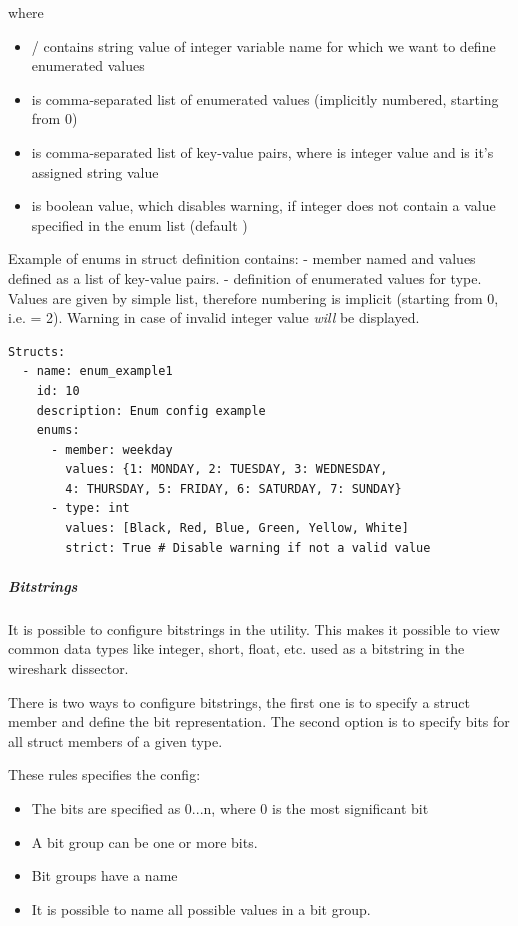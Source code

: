 \documentclass[A4paper,10pt,english]{sphinxmanual}
\begin{document}
where
\begin{itemize}
\item {} 
/ contains string value of integer variable name for which we want to define enumerated values

\item {} 
 is comma-separated list of enumerated values (implicitly numbered, starting from 0)

\item {} 
 is comma-separated list of key-value pairs, where  is integer value and  is it's assigned string value

\item {} 
 is boolean value, which disables warning, if integer does not contain a value specified in the enum list (default )

\end{itemize}

Example of enums in struct definition contains:
- member named  and values defined as a list of key-value pairs.
- definition of enumerated values for  type. Values are given by simple list, therefore numbering is implicit (starting from 0, i.e.  = 2). Warning in case of invalid integer value \emph{will} be displayed.

\begin{Verbatim}[commandchars=\\\{\}]
Structs:
  - name: enum_example1
    id: 10
    description: Enum config example
    enums:
      - member: weekday
        values: {1: MONDAY, 2: TUESDAY, 3: WEDNESDAY, 
        4: THURSDAY, 5: FRIDAY, 6: SATURDAY, 7: SUNDAY}
      - type: int
        values: [Black, Red, Blue, Green, Yellow, White]
        strict: True # Disable warning if not a valid value
\end{Verbatim}


\subparagraph{Bitstrings}
\label{user/config:bitstrings}
It is possible to configure bitstrings in the utility. This makes it possible to view common data types like integer, short, float, etc. used as a bitstring in the wireshark dissector.

There is two ways to configure bitstrings, the first one is to specify a struct member and define the bit representation. The second option is to specify bits for all struct members of a given type.

These rules specifies the config:
\begin{itemize}
\item {} 
The bits are specified as 0...n, where 0 is the most significant bit

\item {} 
A bit group can be one or more bits.

\item {} 
Bit groups have a name

\item {} 
It is possible to name all possible values in a bit group.

\end{itemize}
\end{document}
